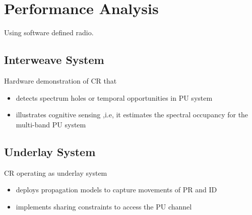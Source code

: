 \chapter{Performance Analysis}
\label{chap:Deploy}
Using software defined radio.
\section{Interweave System}
Hardware demonstration \cite{Kaushik_ISWCS} of \ac{CR} that
\begin{itemize}
\item detects spectrum holes or temporal opportunities in \ac{PU} system 
\item illustrates cognitive sensing ,i.e, it estimates the spectral occupancy for the multi-band \ac{PU} system
\end{itemize}
\section{Underlay System}
\ac{CR} operating as underlay system \cite{Kaushik_CROWNCOM}
\begin{itemize}
\item deploys propagation models to capture movements of \ac{PR} and \ac{ID}
\item implements sharing constraints to access the \ac{PU} channel 
\end{itemize}

